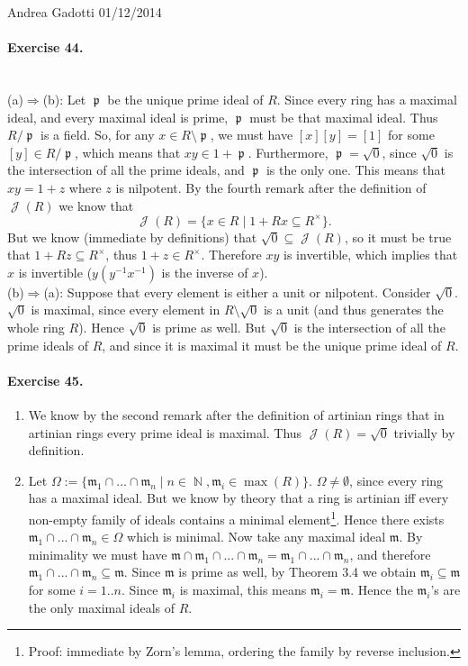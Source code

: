 \documentclass[12pt,a4paper]{report}
\theoremstyle{definition}
\theoremstyle{num.custom-title}
\DeclareMathOperator{\J}{\mathcal{J}}
\DeclareMathOperator{\N}{\mathbb{N}}
\DeclareMathOperator{\p}{\mathfrak{p}}
\DeclareMathOperator{\imp}{\Rightarrow}
\DeclareMathOperator{\sm}{\setminus}
\DeclareMathOperator{\sse}{\subseteq}
\begin{document}
\noindent Andrea Gadotti \hfill 01/12/2014

\paragraph{Exercise 44.} \ \\
(a)$\imp$(b): Let $\p$ be the unique prime ideal of $R$. Since every ring has a maximal ideal, and every maximal ideal is prime, $\p$ must be that maximal ideal. Thus $R/\p$ is a field. So, for any $x \in R \sm \p$, we must have $[x][y]=[1]$ for some $[y] \in R/\p$, which means that $xy \in 1+\p$. Furthermore, $\p=\sqrt{0}$, since $\sqrt{0}$ is the intersection of all the prime ideals, and $\p$ is the only one. This means that $xy=1+z$ where $z$ is nilpotent. By the fourth remark after the definition of $\J(R)$ we know that
\[
\J(R)=\{x \in R \mid 1+Rx \sse R^\times\}.
\]
But we know (immediate by definitions) that $\sqrt{0} \sse \J(R)$, so it must be true that $1+Rz \sse R^\times$, thus $1+z \in R^\times$. Therefore $xy$ is invertible, which implies that $x$ is invertible ($y(y^{-1}x^{-1})$ is the inverse of $x$).\\
(b)$\imp$(a): Suppose that every element is either a unit or nilpotent. Consider $\sqrt{0}$. $\sqrt{0}$ is maximal, since every element in $R \sm \sqrt{0}$ is a unit (and thus generates the whole ring $R$). Hence $\sqrt{0}$ is prime as well. But $\sqrt{0}$ is the intersection of all the prime ideals of $R$, and since it is maximal it must be the unique prime ideal of $R$.

\paragraph{Exercise 45.}
\begin{enumerate}
\item We know by the second remark after the definition of artinian rings that in artinian rings every prime ideal is maximal. Thus $\J(R)=\sqrt{0}$ trivially by definition.
\item Let $\Omega:=\{\mathfrak{m}_1 \cap ... \cap \mathfrak{m}_n \mid n \in \N, \mathfrak{m}_i \in \max(R)\}$. $\Omega \neq \emptyset$, since every ring has a maximal ideal. But we know by theory that a ring is artinian iff every non-empty family of ideals contains a minimal element\footnote{Proof: immediate by Zorn's lemma, ordering the family by reverse inclusion.}. Hence there exists $\mathfrak{m}_1 \cap ... \cap \mathfrak{m}_n \in \Omega$ which is minimal. Now take any maximal ideal $\mathfrak{m}$. By minimality we must have $\mathfrak{m} \cap \mathfrak{m}_1 \cap ... \cap \mathfrak{m}_n = \mathfrak{m}_1 \cap ... \cap \mathfrak{m}_n$, and therefore $\mathfrak{m}_1 \cap ... \cap \mathfrak{m}_n \sse \mathfrak{m}$. Since $\mathfrak{m}$ is prime as well, by Theorem 3.4 we obtain $\mathfrak{m}_i \sse \mathfrak{m}$ for some $i=1..n$. Since $\mathfrak{m}_i$ is maximal, this means $\mathfrak{m}_i=\mathfrak{m}$. Hence the $\mathfrak{m}_i$'s are the only maximal ideals of $R$.
\end{enumerate}
\end{document}
